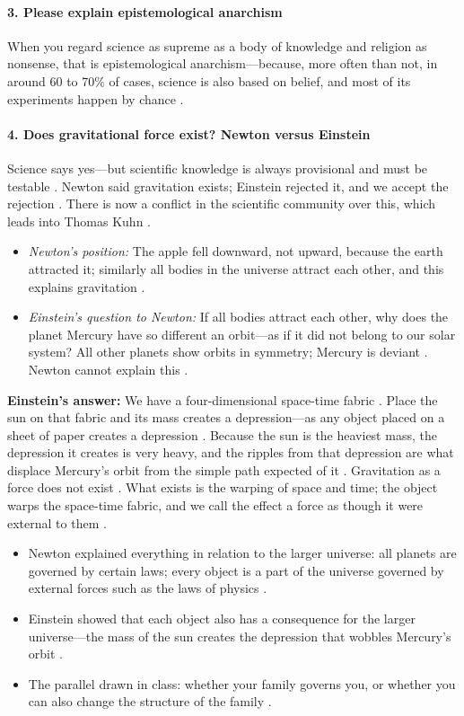 \paragraph{3. Please explain epistemological anarchism}
When you regard science as supreme as a body of knowledge and religion as nonsense, that is epistemological anarchism---because, more often than not, in around 60 to 70\% of cases, science is also based on belief, and most of its experiments happen by chance .

\paragraph{4. Does gravitational force exist? Newton versus Einstein}
Science says yes---but scientific knowledge is always provisional and must be testable . Newton said gravitation exists; Einstein rejected it, and we accept the rejection . There is now a conflict in the scientific community over this, which leads into Thomas Kuhn .
\begin{itemize}
    \item \textit{Newton's position:} The apple fell downward, not upward, because the earth attracted it; similarly all bodies in the universe attract each other, and this explains gravitation .
    \item \textit{Einstein's question to Newton:} If all bodies attract each other, why does the planet Mercury have so different an orbit---as if it did not belong to our solar system?  All other planets show orbits in symmetry; Mercury is deviant . Newton cannot explain this .
\end{itemize}

\begin{ExampleBox}
\textbf{Einstein's answer:} We have a four-dimensional space-time fabric . Place the sun on that fabric and its mass creates a depression---as any object placed on a sheet of paper creates a depression . Because the sun is the heaviest mass, the depression it creates is very heavy, and the ripples from that depression are what displace Mercury's orbit from the simple path expected of it . Gravitation as a force does not exist . What exists is the warping of space and time; the object warps the space-time fabric, and we call the effect a force as though it were external to them .
\end{ExampleBox}

\begin{ComparisonBox}
\begin{itemize}
    \item Newton explained everything in relation to the larger universe: all planets are governed by certain laws; every object is a part of the universe governed by external forces such as the laws of physics .
    \item Einstein showed that each object also has a consequence for the larger universe---the mass of the sun creates the depression that wobbles Mercury's orbit .
    \item The parallel drawn in class: whether your family governs you, or whether you can also change the structure of the family .
\end{itemize}
\end{ComparisonBox}

